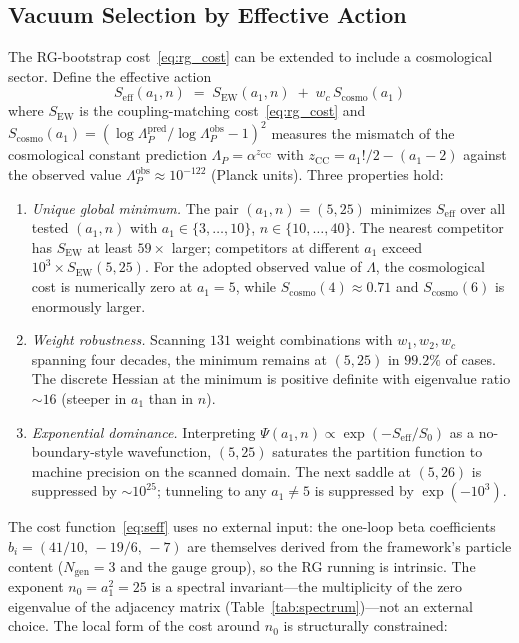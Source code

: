 \documentclass[12pt,a4paper]{article}
\theoremstyle{definition}
\begin{document}
\subsection{Vacuum Selection by Effective Action}
\label{sec:vacuum_selection}

The RG-bootstrap cost~\eqref{eq:rg_cost} can be extended to include a cosmological sector.  Define the effective action
\begin{equation}
S_{\mathrm{eff}}(a_1, n) \;=\; S_{\mathrm{EW}}(a_1, n) \;+\; w_c\, S_{\mathrm{cosmo}}(a_1)
\label{eq:seff}
\end{equation}
where $S_{\mathrm{EW}}$ is the coupling-matching cost~\eqref{eq:rg_cost} and $S_{\mathrm{cosmo}}(a_1) = (\log\Lambda_P^{\mathrm{pred}} / \log\Lambda_P^{\mathrm{obs}} - 1)^2$ measures the mismatch of the cosmological constant prediction $\Lambda_P = \alpha^{z_{\mathrm{CC}}}$ with $z_{\mathrm{CC}} = a_1!/2 - (a_1-2)$ against the observed value $\Lambda_P^{\mathrm{obs}} \approx 10^{-122}$ (Planck units).  Three properties hold:
\begin{enumerate}
\item[(i)] \emph{Unique global minimum.}  The pair $(a_1, n) = (5, 25)$ minimizes $S_{\mathrm{eff}}$ over all tested $(a_1, n)$ with $a_1 \in \{3, \ldots, 10\}$, $n \in \{10, \ldots, 40\}$.  The nearest competitor has $S_{\mathrm{EW}}$ at least $59\times$ larger; competitors at different $a_1$ exceed $10^3 \times S_{\mathrm{EW}}(5,25)$.  For the adopted observed value of $\Lambda$, the cosmological cost is numerically zero at $a_1=5$, while $S_{\mathrm{cosmo}}(4) \approx 0.71$ and $S_{\mathrm{cosmo}}(6)$ is enormously larger.
\item[(ii)] \emph{Weight robustness.}  Scanning $131$ weight combinations with $w_1, w_2, w_c$ spanning four decades, the minimum remains at $(5, 25)$ in $99.2\%$ of cases.  The discrete Hessian at the minimum is positive definite with eigenvalue ratio $\sim\!16$ (steeper in $a_1$ than in $n$).
\item[(iii)] \emph{Exponential dominance.}  Interpreting $\Psi(a_1,n) \propto \exp(-S_{\mathrm{eff}}/S_0)$ as a no-boundary-style wavefunction, $(5,25)$ saturates the partition function to machine precision on the scanned domain.  The next saddle at $(5,26)$ is suppressed by $\sim 10^{25}$; tunneling to any $a_1 \neq 5$ is suppressed by $\exp(-10^3)$.
\end{enumerate}
The cost function~\eqref{eq:seff} uses no external input: the one-loop beta coefficients $b_i = (41/10,\,-19/6,\,-7)$ are themselves derived from the framework's particle content ($N_{\text{gen}} = 3$ and the gauge group), so the RG running is intrinsic.  The exponent $n_0 = a_1^2 = 25$ is a spectral invariant---the multiplicity of the zero eigenvalue of the adjacency matrix (Table~\ref{tab:spectrum})---not an external choice.  The local form of the cost around $n_0$ is structurally constrained:
\end{document}
